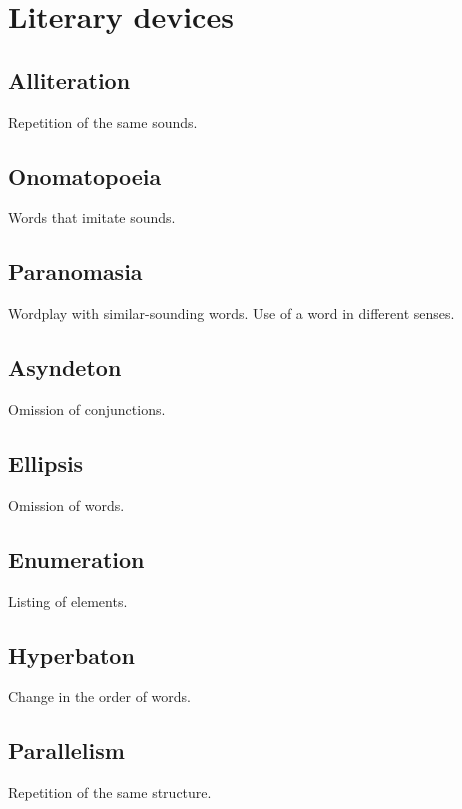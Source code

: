 \documentclass{article}
\begin{document}
\section*{Literary devices}

\subsection*{Alliteration}

Repetition of the same sounds.

\subsection*{Onomatopoeia}

Words that imitate sounds.

\subsection*{Paranomasia}

Wordplay with similar-sounding words.
Use of a word in different senses.

\subsection*{Asyndeton}

Omission of conjunctions.

\subsection*{Ellipsis}

Omission of words.

\subsection*{Enumeration}

Listing of elements.

\subsection*{Hyperbaton}

Change in the order of words.

\subsection*{Parallelism}

Repetition of the same structure.
\end{document}
